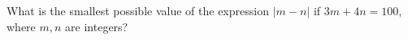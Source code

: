 What is the smallest possible value of the expression $|m-n|$ if $3m+4n=100$, where $m, n$ are integers?

